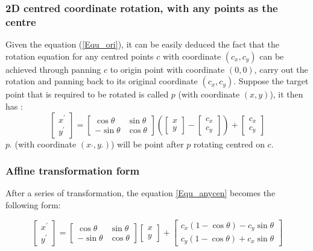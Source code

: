 \subsubsection{2D centred coordinate rotation, with any points as the centre}
Given the equation (\ref{Equ_ori}), it can be easily
deduced the fact that the rotation equation for any centred points $c$ with coordinate $(c_{x}, c_{y})$ can be achieved through
panning $c$ to origin point with coordinate $(0, 0)$, carry out the rotation and panning back to its original coordinate $(c_{x}, c_{y})$.
Suppose the target point that is required to be rotated is called $p$ (with coordinate $(x, y)$), it then has :
\begin{equation} \label{Equ_anycen}
  \begin{bmatrix}
   x^{'} \\ y^{'}
   \end{bmatrix} =   \begin{bmatrix}
      \cos\theta & \sin\theta \\
      -\sin\theta & \cos\theta
    \end{bmatrix} \left(\begin{bmatrix}
      x \\ y
     \end{bmatrix} - \begin{bmatrix}
       c_{x} \\ c_{y}
     \end{bmatrix}\right) + \begin{bmatrix}
        c_{x} \\ c_{y}
       \end{bmatrix}
\end{equation}
$p_{'}$ (with coordinate $(x_{'}, y_{'})$) will be point after $p$ rotating centred on $c$.
\subsubsection{Affine transformation form}
After a series of transformation, the equation \ref{Equ_anycen} becomes the following form:

\begin{equation} \label{Equ_aff}
  \begin{bmatrix}
   x^{'} \\ y^{'}
   \end{bmatrix}  = \begin{bmatrix} \cos\theta & \sin\theta \\ -\sin\theta & \cos\theta \end{bmatrix} \begin{bmatrix} x \\ y \end{bmatrix}
+ \begin{bmatrix} c_{x}(1 - \cos\theta) - c_{y}\sin\theta \\ c_{y}(1 - \cos\theta) + c_{x}\sin\theta \end{bmatrix}
\end{equation}

